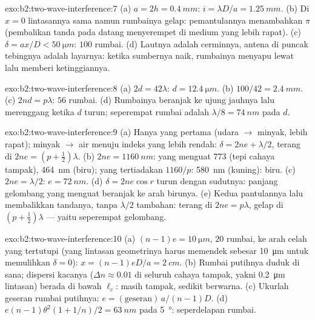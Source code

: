 \begin{solution}{exo:b2:two-wave-interference:7}
(a) $a = 2h = \qty{0.4}{mm}$: $i = \lambda D/a = \qty{1.25}{mm}$. (b) Di $x = 0$ lintasannya
sama namun rumbainya gelap: pemantulannya menambahkan $\pi$ (pembalikan
tanda pada datang menyerempet di medium yang lebih rapat). (c) $\delta = ax/D <
\qty{50}{\micro m}$: $100$ rumbai. (d) Lautnya adalah cerminnya, antena di puncak
tebingnya adalah layarnya: ketika sumbernya naik, rumbainya menyapu lewat lalu
memberi ketinggiannya.
\end{solution}

\begin{solution}{exo:b2:two-wave-interference:8}
(a) $2d = 42\lambda$: $d = \qty{12.4}{\micro m}$. (b) $100/42 = \qty{2.4}{mm}$. (c) $2nd = p\lambda$:
$56$ rumbai. (d) Rumbainya beranjak ke ujung jauhnya lalu merenggang ketika $d$
turun; seperempat rumbai adalah $\lambda/8 = \qty{74}{nm}$ pada $d$.
\end{solution}

\begin{solution}{exo:b2:two-wave-interference:9}
(a) Hanya yang pertama (udara $\to$ minyak, lebih rapat); minyak $\to$ air menuju indeks
yang lebih rendah: $\delta = 2ne + \lambda/2$, terang di $2ne = (p + \tfrac12)\lambda$. (b) $2ne =
\qty{1160}{nm}$: yang menguat $773$ (tepi cahaya tampak), \qty{464}{nm} (biru);
yang tertiadakan $1160/p$: \qty{580}{nm} (kuning): biru. (c) $2ne = \lambda/2$: $e = \qty{72}{nm}$.
(d) $\delta = 2ne\cos r$ turun dengan sudutnya: panjang gelombang yang menguat
beranjak ke arah birunya. (e) Kedua pantulannya lalu membalikkan tandanya, tanpa
$\lambda/2$ tambahan: terang di $2ne = p\lambda$, gelap di $(p + \tfrac12)\lambda$ --- yaitu
 seperempat gelombang.
\end{solution}

\begin{solution}{exo:b2:two-wave-interference:10}
(a) $(n - 1)e = \qty{10}{\micro m}$, $20$ rumbai, ke arah celah yang tertutupi (yang
lintasan geometrinya harus memendek sebesar \qty{10}{\micro m} untuk memulihkan $\delta = 0$):
$x = (n - 1)eD/a = \qty{2}{cm}$. (b) Rumbai putihnya duduk di sana; dispersi
kacanya ($\Delta n \approx 0.01$ di seluruh cahaya tampak, yakni \qty{0.2}{\micro m} lintasan)
berada di bawah $\ell_c$: masih tampak, sedikit berwarna. (c) Ukurlah
geseran rumbai putihnya: $e = (\text{geseran})\,a/(n - 1)D$. (d) $e(n - 1)\theta^2
(1 + 1/n)/2 = \qty{63}{nm}$ pada \qty{5}{\degree}: seperdelapan rumbai.
\end{solution}

